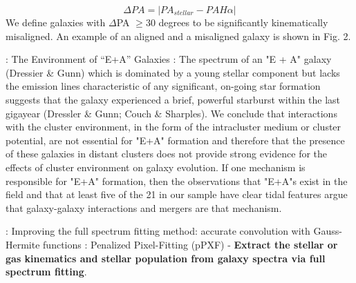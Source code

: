 \documentclass[ceqn,usenatbib,onecolumn]{mnras}
\begin{document}
$$\Delta{PA}=|PA_{stellar}−PAH\alpha|$$
We define galaxies with $\Delta$PA $\ge 30$ degrees to be significantly kinematically misaligned. An example of an aligned and a misaligned galaxy is shown in Fig. 2.
\par \citet{1996ApJ...466..104Z} : {The Environment of ``E+A'' Galaxies} : The spectrum of an "E + A" galaxy (Dressier \& Gunn) which is dominated by a young stellar component but lacks the emission lines characteristic of any significant, on-going star formation suggests that the galaxy experienced a brief, powerful starburst within the last gigayear (Dressler \& Gunn; Couch \& Sharples). We conclude that interactions with the cluster environment, in the form of the intracluster medium or cluster potential, are not essential for "E+A" formation and therefore that the presence of these galaxies in distant clusters does not provide strong evidence for the effects of cluster environment on galaxy evolution. If one mechanism is responsible for "E+A" formation, then the observations that "E+A"s exist in the field and that at least five of the 21 in our sample have clear tidal features argue that galaxy-galaxy interactions and mergers are that mechanism. 
\par \citet{2017MNRAS.466..798C} : {Improving the full spectrum fitting method: accurate convolution with Gauss-Hermite functions} : Penalized Pixel-Fitting (pPXF) - \textbf{Extract the stellar or gas kinematics and stellar population from galaxy spectra via full spectrum fitting}.
\end{document}
